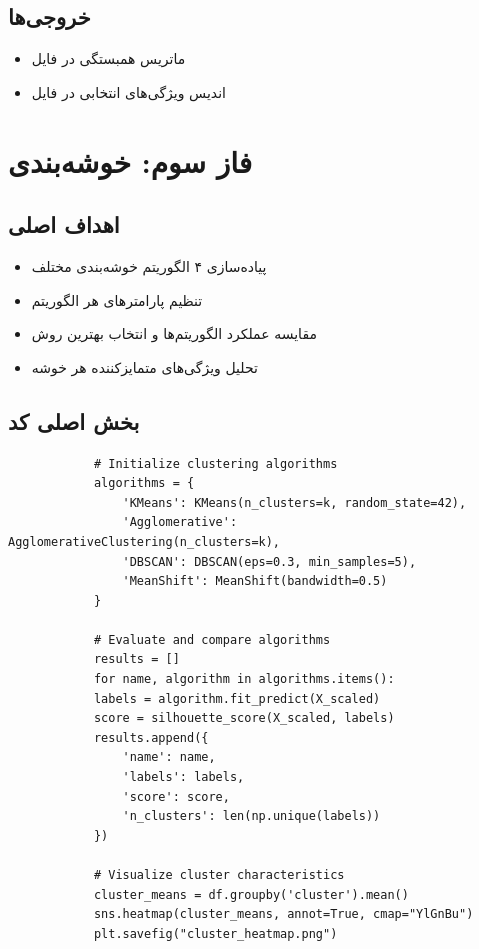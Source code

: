 \documentclass[a4paper,12pt]{article}
\let\nobreaksection\section
\renewcommand{\section}{\nobreaksection}
\begin{document}
	\subsection{خروجی‌ها}
	\begin{itemize}
		\item ماتریس همبستگی در فایل 
		\item اندیس ویژگی‌های انتخابی در فایل 
	\end{itemize}
	
	
	\section{فاز سوم: خوشه‌بندی}
	
	\subsection{اهداف اصلی}
	\begin{itemize}
		\item پیاده‌سازی ۴ الگوریتم خوشه‌بندی مختلف
		\item تنظیم پارامترهای هر الگوریتم
		\item مقایسه عملکرد الگوریتم‌ها و انتخاب بهترین روش
		\item تحلیل ویژگی‌های متمایزکننده هر خوشه
	\end{itemize}
	
	\subsection{بخش اصلی کد}
	\begin{latin}
		\begin{verbatim}
			# Initialize clustering algorithms
			algorithms = {
				'KMeans': KMeans(n_clusters=k, random_state=42),
				'Agglomerative': AgglomerativeClustering(n_clusters=k),
				'DBSCAN': DBSCAN(eps=0.3, min_samples=5),
				'MeanShift': MeanShift(bandwidth=0.5)
			}
			
			# Evaluate and compare algorithms
			results = []
			for name, algorithm in algorithms.items():
			labels = algorithm.fit_predict(X_scaled)
			score = silhouette_score(X_scaled, labels)
			results.append({
				'name': name,
				'labels': labels,
				'score': score,
				'n_clusters': len(np.unique(labels))
			})
			
			# Visualize cluster characteristics
			cluster_means = df.groupby('cluster').mean()
			sns.heatmap(cluster_means, annot=True, cmap="YlGnBu")
			plt.savefig("cluster_heatmap.png")
		\end{verbatim}
	\end{latin}
	
\end{document}
